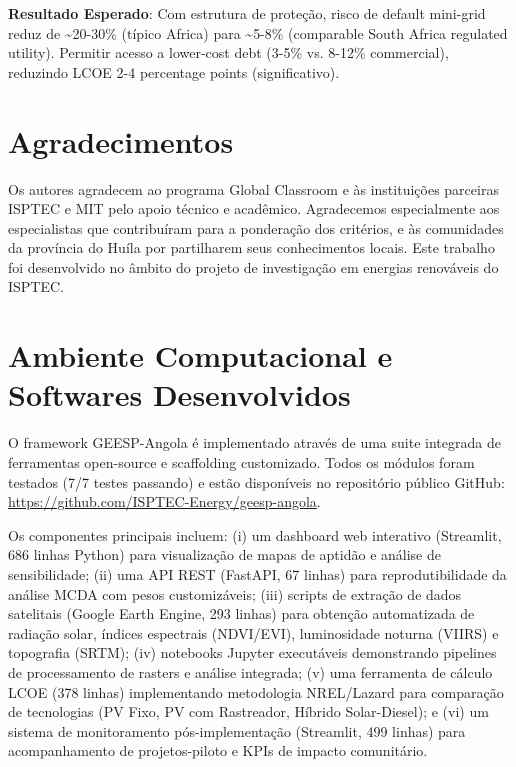 \documentclass[12pt, a4paper]{article}
\begin{document}
\textbf{Resultado Esperado}: Com estrutura de proteção, risco de default mini-grid reduz de \textasciitilde{}20-30\% (típico Africa) para \textasciitilde{}5-8\% (comparable South Africa regulated utility). Permitir acesso a lower-cost debt (3-5\% vs. 8-12\% commercial), reduzindo LCOE 2-4 percentage points (significativo).

\section*{Agradecimentos}

Os autores agradecem ao programa Global Classroom e às instituições parceiras ISPTEC e MIT pelo apoio técnico e acadêmico. Agradecemos especialmente aos especialistas que contribuíram para a ponderação dos critérios, e às comunidades da província do Huíla por partilharem seus conhecimentos locais. Este trabalho foi desenvolvido no âmbito do projeto de investigação em energias renováveis do ISPTEC.




\appendix

\section{Ambiente Computacional e Softwares Desenvolvidos}

O framework GEESP-Angola é implementado através de uma suite integrada de ferramentas open-source e scaffolding customizado. Todos os módulos foram testados (7/7 testes passando) e estão disponíveis no repositório público GitHub: \url{https://github.com/ISPTEC-Energy/geesp-angola}.

Os componentes principais incluem: (i) um dashboard web interativo (Streamlit, 686 linhas Python) para visualização de mapas de aptidão e  análise de sensibilidade; (ii) uma API REST (FastAPI, 67 linhas) para reprodutibilidade da análise MCDA com pesos customizáveis; (iii) scripts de extração de dados satelitais (Google Earth Engine, 293 linhas) para obtenção automatizada de radiação solar, índices espectrais (NDVI/EVI), luminosidade noturna (VIIRS) e topografia (SRTM); (iv) notebooks Jupyter executáveis demonstrando pipelines de processamento de rasters e análise integrada; (v) uma ferramenta de cálculo LCOE (378 linhas) implementando metodologia NREL/Lazard para comparação de tecnologias (PV Fixo, PV com Rastreador, Híbrido Solar-Diesel); e (vi) um sistema de monitoramento pós-implementação (Streamlit, 499 linhas) para acompanhamento de projetos-piloto e KPIs de impacto comunitário.
\end{document}

